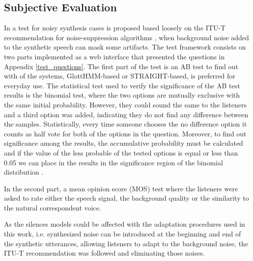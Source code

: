 \subsection{Subjective Evaluation}
\label{evaluation_subjective}
In \cite{karhila_remes_icassp13} a test for noisy synthesis cases is proposed based loosely on the ITU-T recommendation for noise-suppression algorithms \cite{itut835}, when background noise added to the synthetic speech can mask some artifacts.
%
The test framework consists on two parts implemented as a web interface that presented the questions in Appendix \ref{test_questions}.
%
The first part of the test is an AB test to find out with of the systems, GlottHMM-based or STRAIGHT-based, is preferred for everyday use.
%
The statistical test used to verify the significance of the AB test results is the binomial test, where the two options are mutually exclusive with the same initial probability.
%
However, they could sound the same to the listeners and a third option was added, indicating they do not find any difference between the samples.
%
Statistically, every time someone chooses the no difference option it counts as half vote for both of the options in the question.
%
Moreover, to find out significance among the results, the accumulative probability must be calculated and if the value of the less probable of the tested options is equal or less than 0.05 we can place in the results in the significance region of the binomial distribution \cite{howell2012statistical}.

In the second part, a mean opinion score (MOS) test where the listeners were asked to rate either the speech signal, the background quality or the similarity to the natural correspondent voice.

As the silences models could be affected with the adaptation procedures used in this work, i.e. synthesized noise can be introduced at the beginning and end of the synthetic utterances, allowing listeners to adapt to the background noise, the ITU-T recommendation \cite{itut835} was followed and eliminating those noises.